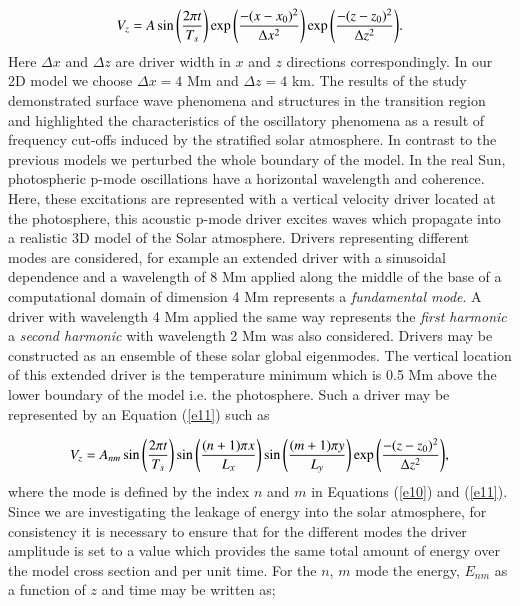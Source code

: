 \documentclass[authoryear,final,1p]{elsarticle}
\begin{document}
\begin{equation}
V_{z}=A \sin{\left({2\pi t}\over{T_s} \right)  }  \exp{\left( -{(x-x_0)^{2}}\over{\Delta x^{2}} \right) } 
\exp{\left( -{(z-z_0)^{2}}\over{\Delta z^{2}} \right) }.
\label{e10}
\end{equation}
Here $\Delta x$ and $\Delta z$ are driver width in $x$ and $z$ directions correspondingly. In our 2D model 
we choose $\Delta x= 4$ Mm and $\Delta z=4$ km. The results of the study demonstrated surface wave 
phenomena and structures in the transition region and highlighted the characteristics of the oscillatory 
phenomena as a result of frequency cut-offs induced by the stratified solar atmosphere. In contrast to the 
previous models we perturbed the whole boundary of the model.  In the real Sun, photospheric p-mode 
oscillations have a horizontal wavelength and coherence. Here, these excitations are represented with a 
vertical velocity driver located at the photosphere, this acoustic p-mode driver excites waves which propagate 
into a realistic 3D model of the Solar atmosphere. Drivers representing different modes are considered, for 
example  an extended driver with a sinusoidal dependence and a wavelength of 8 Mm applied along the 
middle of the base of a computational domain of dimension 4 Mm represents  a {\it fundamental mode}. 
A driver with wavelength 4 Mm applied the same way represents the {\it first harmonic} a {\it second harmonic} 
with wavelength 2 Mm was also considered. Drivers may be constructed as an ensemble of these solar 
global eigenmodes.  The vertical location of this extended driver is the temperature minimum which is 
0.5 Mm above the lower boundary of the model i.e. the photosphere. Such a driver may be represented 
by an Equation (\ref{e11}) such as  

\begin{equation}
V_{z}=A_{nm} \sin{\left({2\pi t}\over{T_s} \right)  }\sin{\left(  {(n+1)\pi x}\over{L_x} \right)}   \sin{\left(  {(m+1)\pi y}\over{L_y} \right)}    \exp{\left( -{(z-z_0)^{2}}\over{\Delta z^{2}} \right) },
\label{e11}
\end{equation}
where the mode is defined by the index $n$ and $m$ in Equations (\ref{e10}) and (\ref{e11}). Since we are investigating the leakage of energy into the solar atmosphere, for consistency it is necessary to ensure that for the different modes the driver amplitude is set to a value which provides the same total amount of energy over the model cross section and per unit time. For the $n$, $m$ mode the energy, $E_{nm}$ as a function of $z$ and time may be written as;
\end{document}
